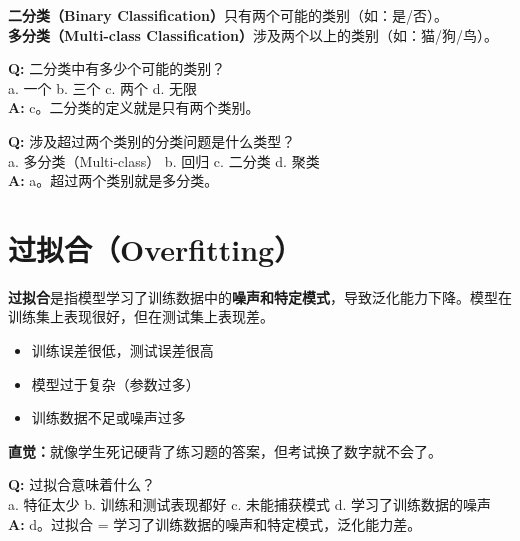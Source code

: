 \documentclass[11pt,a4paper]{article}
\begin{document}
\begin{bluebox}[二分类与多分类]
\textbf{二分类（Binary Classification）}只有两个可能的类别（如：是/否）。\\
\textbf{多分类（Multi-class Classification）}涉及两个以上的类别（如：猫/狗/鸟）。
\end{bluebox}

\begin{examplebox}[例题：二分类的类别数]
\textbf{Q:} 二分类中有多少个可能的类别？\\
a. 一个 \quad b. 三个 \quad c. 两个 \quad d. 无限\\
\textbf{A:} c。二分类的定义就是只有两个类别。
\end{examplebox}

\begin{examplebox}[例题：多分类定义]
\textbf{Q:} 涉及超过两个类别的分类问题是什么类型？\\
a. 多分类（Multi-class） \quad b. 回归 \quad c. 二分类 \quad d. 聚类\\
\textbf{A:} a。超过两个类别就是多分类。
\end{examplebox}

\section{过拟合（Overfitting）}

\begin{bluebox}[过拟合的本质]
\textbf{过拟合}是指模型学习了训练数据中的\textbf{噪声和特定模式}，导致泛化能力下降。模型在训练集上表现很好，但在测试集上表现差。
\end{bluebox}

\begin{orangebox}[过拟合的特征]
\begin{itemize}
    \item 训练误差很低，测试误差很高
    \item 模型过于复杂（参数过多）
    \item 训练数据不足或噪声过多
\end{itemize}
\textbf{直觉：}就像学生死记硬背了练习题的答案，但考试换了数字就不会了。
\end{orangebox}

\begin{examplebox}[例题：过拟合的定义]
\textbf{Q:} 过拟合意味着什么？\\
a. 特征太少 \quad b. 训练和测试表现都好 \quad c. 未能捕获模式 \quad d. 学习了训练数据的噪声\\
\textbf{A:} d。过拟合 = 学习了训练数据的噪声和特定模式，泛化能力差。
\end{examplebox}
\end{document}

